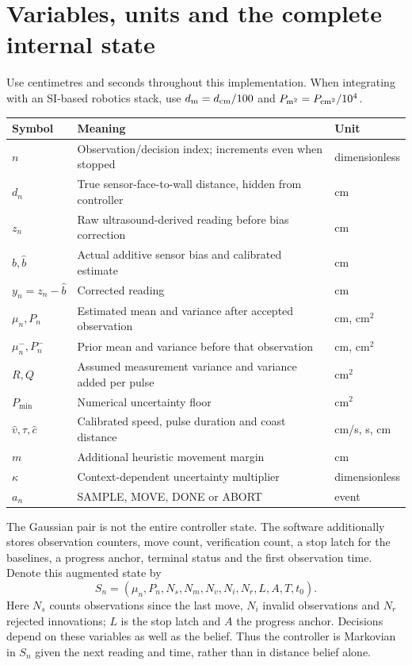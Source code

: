 \documentclass[11pt,a4paper]{article}
\begin{document}
\section{Variables, units and the complete internal state}
Use centimetres and seconds throughout this implementation. When integrating with an SI-based robotics stack, use $d_{\rm m}=d_{\rm cm}/100$ and $P_{\rm m^2}=P_{\rm cm^2}/10^4$.
\begin{longtable}{p{.17\linewidth}p{.55\linewidth}p{.18\linewidth}}
\toprule Symbol & Meaning & Unit\\\midrule\endhead
$n$ & Observation/decision index; increments even when stopped & dimensionless\\
$d_n$ & True sensor-face-to-wall distance, hidden from controller & cm\\
$z_n$ & Raw ultrasound-derived reading before bias correction & cm\\
$b,\hat b$ & Actual additive sensor bias and calibrated estimate & cm\\
$y_n=z_n-\hat b$ & Corrected reading & cm\\
$\mu_n,P_n$ & Estimated mean and variance after accepted observation & cm, cm$^2$\\
$\mu_n^-,P_n^-$ & Prior mean and variance before that observation & cm, cm$^2$\\
$R,Q$ & Assumed measurement variance and variance added per pulse & cm$^2$\\
$P_{\min}$ & Numerical uncertainty floor & cm$^2$\\
$\hat v,\tau,\hat c$ & Calibrated speed, pulse duration and coast distance & cm/s, s, cm\\
$m$ & Additional heuristic movement margin & cm\\
$\kappa$ & Context-dependent uncertainty multiplier & dimensionless\\
$a_n$ & SAMPLE, MOVE, DONE or ABORT & event\\
\bottomrule
\end{longtable}
The Gaussian pair is not the entire controller state. The software additionally stores observation counters, move count, verification count, a stop latch for the baselines, a progress anchor, terminal status and the first observation time. Denote this augmented state by
\[
 S_n=(\mu_n,P_n,N_s,N_m,N_v,N_i,N_r,L,A,T,t_0).
\]
Here $N_s$ counts observations since the last move, $N_i$ invalid observations and $N_r$ rejected innovations; $L$ is the stop latch and $A$ the progress anchor. Decisions depend on these variables as well as the belief. Thus the controller is Markovian in $S_n$ given the next reading and time, rather than in distance belief alone.
\end{document}
